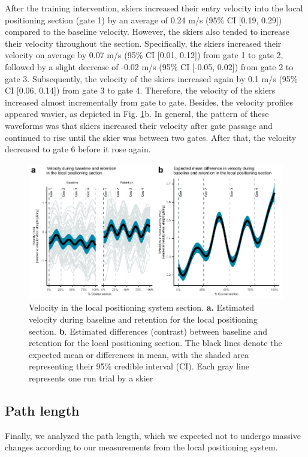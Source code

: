 \documentclass{article}
\begin{document}
After the training intervention, skiers increased their entry velocity into the local positioning section (gate 1) by an average of 0.24 m/s (95\% CI [0.19, 0.29]) compared to the baseline velocity. However, the skiers also tended to increase their velocity throughout the section. Specifically, the skiers increased their velocity on average by 0.07 m/s (95\% CI [0.01, 0.12]) from gate 1 to gate 2, followed by a slight decrease of -0.02 m/s (95\% CI [-0.05, 0.02]) from gate 2 to gate 3. Subsequently, the velocity of the skiers increased again by 0.1 m/s (95\% CI [0.06, 0.14]) from gate 3 to gate 4. Therefore, the velocity of the skiers increased almost incrementally from gate to gate. Besides, the velocity profiles appeared wavier, as depicted in Fig. \ref{fig: velocity}b. In general, the pattern of these waveforms was that skiers increased their velocity after gate passage and continued to rise until the skier was between two gates. After that, the velocity decreased to gate 6 before it rose again. 

\begin{figure}
    \centering
    \includegraphics[width=1\linewidth]{figurer/figure_velocity_5.pdf}
    \caption{Velocity in the local positioning system section. \textbf{a.} Estimated velocity during baseline and retention for the local positioning section. \textbf{b}. Estimated differences (contrast) between baseline and retention for the local positioning section. The black lines denote the expected mean or differences in mean, with the shaded area representing their 95\% credible interval (CI). Each gray line represents one run trial by a skier}
    \label{fig: velocity}
\end{figure}

\subsection{Path length}
Finally, we analyzed the path length, which we expected not to undergo massive changes according to our measurements from the local positioning system. 
\end{document}
